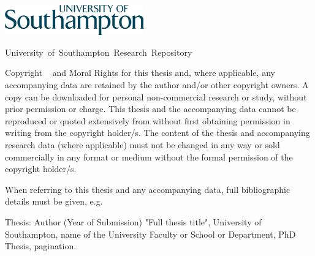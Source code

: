 \clearpage
\thispagestyle{empty} 

\hfill\includegraphics[width=6cm]{Images/UoSLogo.png}

\begin{center}{\selectfont\huge
\textcolor{sotonGrey}{University~of~Southampton~Research~Repository}\par}
\end{center}
\vspace{1cm}

Copyright \textcopyright~ and Moral Rights for this thesis and, where
applicable, any accompanying data are retained by the author and/or other
copyright owners. A copy can be downloaded for personal non-commercial research
or study, without prior permission or charge. This thesis and the accompanying
data cannot be reproduced or quoted extensively from without first obtaining
permission in writing from the copyright holder/s. The content of the thesis
and accompanying research data (where applicable) must not be changed in any
way or sold commercially in any format or medium without the formal permission
of the copyright holder/s.

\bigskip

\noindent
When referring to this thesis and any accompanying data, full bibliographic
details must be given, e.g.

\bigskip

\noindent
Thesis: Author (Year of Submission) "Full thesis title", University of
Southampton, name of the University Faculty or School or Department,
PhD Thesis, pagination.

\bigskip

\restoregeometry